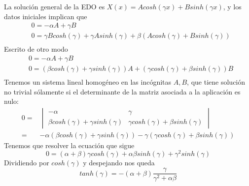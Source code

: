 \begin{itemize}
La solución general de la EDO es $X(x) = Acosh(\gamma x)+Bsinh(\gamma x)$, y los datos iniciales implican que
\begin{align*}
& 0 = -\alpha A+\gamma B\\
& 0 = \gamma B cosh(\gamma) + \gamma Asinh(\gamma)+\beta (Acosh(\gamma)+Bsinh(\gamma))\\
\end{align*}
Escrito de otro modo
\begin{align*}
& 0 = -\alpha A+\gamma B\\
& 0 = \left(\beta cosh(\gamma)+\gamma sinh(\gamma)\right)A+\left(\gamma cosh(\gamma)+\beta sinh(\gamma)\right)B\\
\end{align*}
Tenemos un sistema lineal homogéneo en las incógnitas $A,B$, que tiene solución no trivial sólamente si el determinante de la matriz asociada a la aplicación es nulo:
\begin{align*}
0=&\begin{vmatrix}-\alpha & \gamma \\ \beta cosh(\gamma)+\gamma sinh(\gamma) & \gamma cosh(\gamma) +\beta sinh(\gamma)\end{vmatrix}\\
 = & -\alpha(\beta cosh(\gamma)+\gamma sinh(\gamma))-\gamma(\gamma cosh(\gamma) +\beta sinh(\gamma))
\end{align*}
Tenemos que resolver la ecuación que sigue
$$0=(\alpha+\beta)\gamma cosh(\gamma) +\alpha\beta sinh(\gamma)+\gamma^2sinh(\gamma)$$
Dividiendo por $cosh(\gamma)$ y despejando nos queda
$$tanh(\gamma) = -(\alpha+\beta)\frac{\gamma}{\gamma^2+\alpha\beta}$$
\end{itemize}


